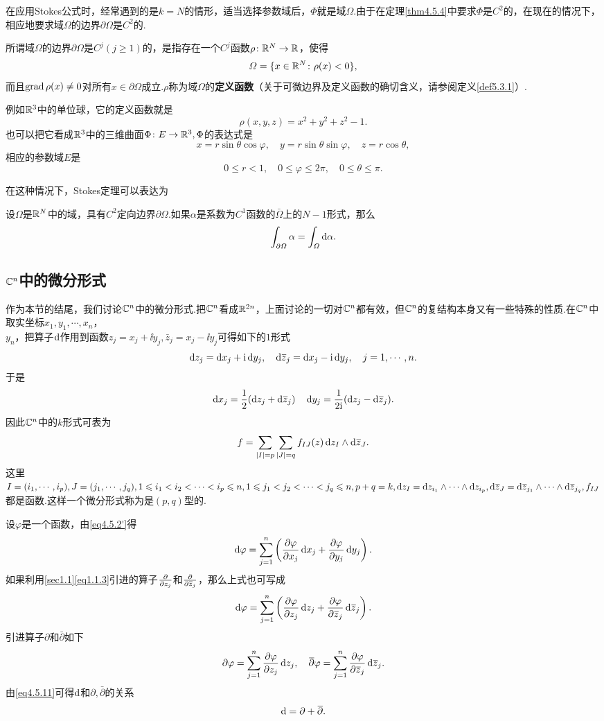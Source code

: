 在应用Stokes公式时，经常遇到的是$k=N$的情形，适当选择参数域后，$\Phi$就是域$\Omega$.由于在定理\ref{thm4.5.4}中要求$\Phi$是$C^2$的，在现在的情况下，相应地要求域$\Omega$的边界$\partial\Omega$是$C^2$的.

所谓域$\Omega$的边界$\partial\Omega$是$C^j(j\ge1)$的，是指存在一个$C^j$函数$\rho\colon\MR^N\to\MR$，使得
\[\Omega=\{x\in\MR^N\colon\rho(x)<0\},\]
而且$\grad\rho(x)\neq0$对所有$x\in\partial\Omega$成立.$\rho$称为域$\Omega$的\textbf{定义函数}（关于可微边界及定义函数的确切含义，请参阅定义\ref{def5.3.1}）.

例如$\MR^3$中的单位球，它的定义函数就是
\[\rho(x,y,z)=x^2+y^2+z^2-1.\]
也可以把它看成$\MR^3$中的三维曲面$\Phi\colon E\to\MR^3,\Phi$的表达式是
\[x=r\sin\theta\cos\varphi,\quad y=r\sin\theta\sin\varphi,\quad z=r\cos\theta,\]
相应的参数域$E$是
\[0\le r<1,\quad 0\le\varphi\le2\pi,\quad 0\le\theta\le\pi.\]

在这种情况下，Stokes定理可以表达为
\begin{theorem}\label{thm4.5.5}
	设$\Omega$是$\MR^N$中的域，具有$C^2$定向边界$\partial\Omega$.如果$\alpha$是系数为$C^1$函数的$\bar{\Omega}$上的$N-1$形式，那么
	\[\int_{\partial\Omega}\alpha=\int_\Omega \dif\alpha.\]
\end{theorem}
\subsection{$\MC^n$中的微分形式}
作为本节的结尾，我们讨论$\MC^n$中的微分形式.把$\MC^n$看成$\MR^{2n}$，上面讨论的一切对$\MC^n$都有效，但$\MC^n$的复结构本身又有一些特殊的性质.在$\MC^n$中取实坐标$x_1,y_1,\cdots,x_n$，\\
$y_n$，把算子$\dif$作用到函数$z_j=x_j+\ii y_j,\bar{z}_j=x_j-\ii y_j$可得如下的$1$形式
\[\dif z_j=\dx_j+\ii\dy_j,\quad \dif\bar{z}_j=\dx_j-\ii\dy_j,\quad j=1,\cdots,n.\]
于是
\[\dx_j=\frac12(\dz_j+\dzz_j)\quad \dy_j=\frac1{2\ii}(\dz_j-\dzz_j).\]
因此$\MC^n$中的$k$形式可表为
\[f=\sum_{|I|=p}\sum_{|J|=q}f_{IJ}(z)\dz_I\wedge\dzz_J.\]
这里$I=(i_1,\cdots,i_p),J=(j_1,\cdots,j_q),1\le i_1<i_2<\cdots<i_p\le n,1\le j_1<j_2<\cdots<j_q\le n,p+q=k,\dz_I=\dz_{i_1}\wedge\cdots\wedge\dz_{i_p},\dzz_J=\dzz_{j_1}\wedge\cdots\wedge\dzz_{j_q},f_{IJ}$都是函数.这样一个微分形式称为是$(p,q)$型的.

设$\varphi$是一个函数，由\eqref{eq4.5.2'}得
\[\dif\varphi=\sum_{j=1}^{n}\left(\pp{\varphi}{x_j}\dx_j+\pp{\varphi}{y_j}\dy_j\right).\]
如果利用\ref{sec1.1}\eqref{eq1.1.3}引进的算子$\pp{}{z_j}$和$\pp{}{\bar{z}_j}$，那么上式也可写成
\begin{equation}\label{eq4.5.11}
	\dif\varphi=\sum_{j=1}^{n}\left(\pp{\varphi}{z_j}\dz_j+\pp{\varphi}{\bar{z}_j}\dzz_j\right).
\end{equation}
引进算子$\partial$和$\bar{\partial}$如下
\[\partial\varphi=\sum_{j=1}^{n}\pp{\varphi}{z_j}\dz_j,\quad \bar{\partial}\varphi=\sum_{j=1}^{n}\pp{\varphi}{\bar{z}_j}\dzz_j.\]
由\eqref{eq4.5.11}可得$\dif$和$\partial,\bar{\partial}$的关系
\[\dif=\partial+\bar{\partial}.\]

